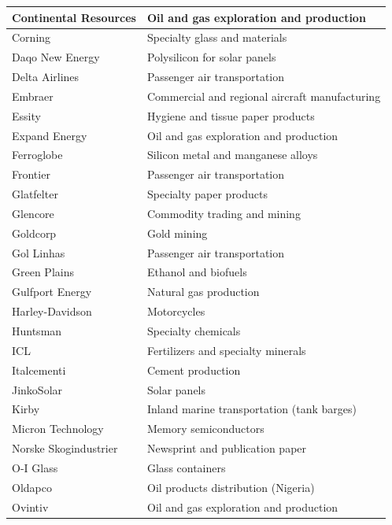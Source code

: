 \begin{longtable}{|l|l|}
    \hline
    Continental Resources & Oil and gas exploration and production \\
    \hline
    Corning & Specialty glass and materials \\
    \hline
    Daqo New Energy & Polysilicon for solar panels \\
    \hline
    Delta Airlines & Passenger air transportation \\
    \hline
    Embraer & Commercial and regional aircraft manufacturing \\
    \hline
    Essity & Hygiene and tissue paper products \\
    \hline
    Expand Energy & Oil and gas exploration and production \\
    \hline
    Ferroglobe & Silicon metal and manganese alloys \\
    \hline
    Frontier & Passenger air transportation \\
    \hline
    Glatfelter & Specialty paper products \\
    \hline
    Glencore & Commodity trading and mining \\
    \hline
    Goldcorp & Gold mining \\
    \hline
    Gol Linhas & Passenger air transportation \\
    \hline
    Green Plains & Ethanol and biofuels \\
    \hline
    Gulfport Energy & Natural gas production \\
    \hline
    Harley-Davidson & Motorcycles \\
    \hline
    Huntsman & Specialty chemicals \\
    \hline
    ICL & Fertilizers and specialty minerals \\
    \hline
    Italcementi & Cement production \\
    \hline
    JinkoSolar & Solar panels \\
    \hline
    Kirby & Inland marine transportation (tank barges) \\
    \hline
    Micron Technology & Memory semiconductors \\
    \hline
    Norske Skogindustrier & Newsprint and publication paper \\
    \hline
    O-I Glass & Glass containers \\
    \hline
    Oldapco & Oil products distribution (Nigeria) \\
    \hline
    Ovintiv & Oil and gas exploration and production \\

\end{longtable}
